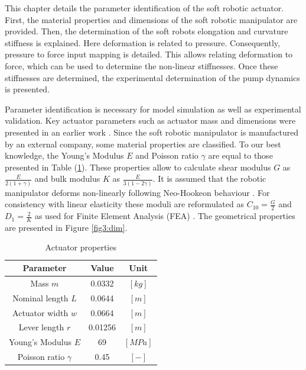 \label{chap3}

This chapter details the parameter identification of the soft robotic actuator. First, the material properties and dimensions of the soft robotic manipulator are provided. Then, the determination of the soft robots elongation and curvature stiffness is explained. Here deformation is related to pressure. Consequently, pressure to force input mapping is detailed. This allows relating deformation to force, which can be used to determine the non-linear stiffnesses. Once these stiffnesses are determined, the experimental determination of the pump dynamics is presented. 


Parameter identification is necessary for model simulation as well as experimental validation. Key actuator parameters such as actuator mass and dimensions were presented in an earlier work \cite{berkers}. Since the soft robotic manipulator is manufactured by an external company, some material properties are classified. To our best knowledge, the Young's Modulus $E$ and Poisson ratio $\gamma$ are equal to those presented in Table (\ref{tab4:parameters}). These properties allow to calculate shear modulus $G$ as $\frac{E}{2(1+\gamma)}$ and bulk modulus $K$ as $\frac{E}{3(1-2\gamma)}$. It is assumed that the robotic manipulator deforms non-linearly following Neo-Hookeon behaviour \cite{Caasenbrood2020StiffnessModel}. For consistency with linear elasticity these moduli are reformulated as $C_{10} = \frac{G}{2}$ and $D_{1} = \frac{2}{K}$ as used for Finite Element Analysis (FEA) \cite{neohookean}. The geometrical properties are presented in Figure \ref{fig3:dim}.


\begin{table}[H]
    \centering
    \caption{Actuator properties}
    \begin{tabular}{|c|c|c|} \hline
      \textbf{Parameter}   &  \textbf{Value} & \textbf{Unit} \\ \hline
      Mass $m$             &    0.0332       & $[kg]$ \\ 
      Nominal length $L$ &    0.0644       & $[m]$  \\ 
      Actuator width  $w$     &    0.0664    & $[m]$  \\
      Lever length $r$     &    0.01256      & $[m]$  \\ 
      Young's Modulus $E$  &    69           & $[MPa]$\\ 
      Poisson ratio $\gamma$ &    0.45          & $[-]$ \\ \hline
    \end{tabular}
    \label{tab4:parameters}
\end{table}

